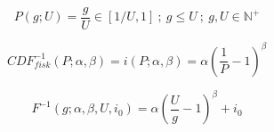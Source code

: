 \begin{equation} \label{eq:Propability}
 P(g;U)=\frac{g}{U} \in [1/U,1] ~;~ g \leq U ~;~ g,U \in \mathbb{N}^+
\end{equation}

\begin{equation} \label{eq:CDFfiskInverse}
 CDF^{-1}_{fisk}(P;\alpha,\beta)=i(P;\alpha,\beta)=\alpha\left(\frac{1}{P}-1\right)^\beta
\end{equation}

\begin{equation} \label{eq:FInverse}
 F^{-1}(g;\alpha,\beta,U,i_0)
 =\alpha\left(\frac{U}{g}-1\right)^\beta+i_0
\end{equation}

